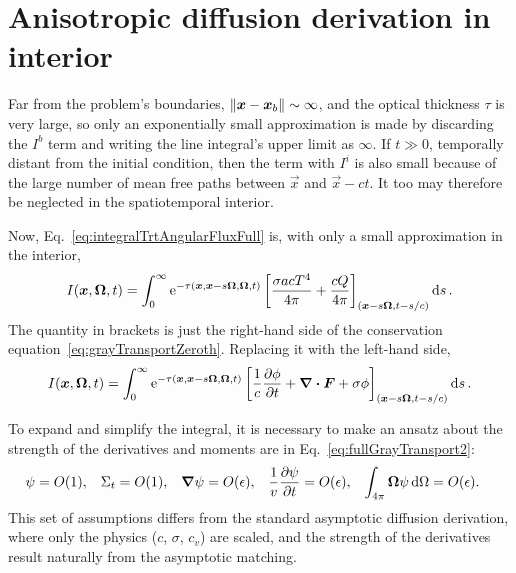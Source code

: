 \section{Anisotropic diffusion derivation in interior}
Far from the problem's boundaries, $\left\| \bm{x} - \bm{x}_b \right\| \sim \infty$,
and the optical thickness $\tau$ is very large, so only an exponentially small
approximation is made by discarding the $I^b$ term and writing the line
integral's upper limit as $\infty$. If $t\gg 0$, temporally distant from the
initial condition, then the term with $I^i$ is also small because of the large
number of mean free paths between $\vec{x}$ and $\vec{x} - c t$. It too may
therefore be neglected in the spatiotemporal interior.

Now, Eq.~\eqref{eq:integralTrtAngularFluxFull} is, with only a small
approximation in the interior,
\begin{equation*}
    I(\bm{x}, \bm{\Omega}, t)
    = \int_{0}^{\infty}
    \mathop{}\!\mathrm{e}^{ -\tau(\bm{x}, \bm{x} - s \bm{\Omega}, \bm{\Omega}, t)}
    \left[ \frac{\sigma a c T^4}{4\pi} + \frac{c Q}{4\pi} \right]_{(\bm{x} - s
    \bm{\Omega}, t-s/c)} \mathop{}\!\mathrm{d} s\,.
\end{equation*}
The quantity in brackets is just the right-hand side of the conservation
equation~\eqref{eq:grayTransportZeroth}. Replacing it with the left-hand
side,
\begin{equation*}
    I(\bm{x}, \bm{\Omega}, t)
    = \int_{0}^{\infty}
    \mathop{}\!\mathrm{e}^{ -\tau(\bm{x}, \bm{x} - s \bm{\Omega}, \bm{\Omega}, t)}
    \left[ \frac{1}{c} \frac{\partial \phi}{\partial t} +\bm{\nabla} \bm{\cdot} \bm{F} + \sigma \phi
    \right]_{(\bm{x} - s \bm{\Omega}, t-s/c)} \mathop{}\!\mathrm{d} s\,.
\end{equation*}

To expand and simplify the integral, it is necessary to make an ansatz about
the strength of the derivatives and moments are in
Eq.~\eqref{eq:fullGrayTransport2}:
\begin{align*}
  \psi &= O(1), &
  \Sigma_t &= O(1), &
  \bm{\nabla} \psi &= O(\epsilon), &
  \frac1v\frac{\partial \psi}{\partial t} &= O(\epsilon), &
  \int_{4\pi} \bm{\Omega} \psi\mathop{}\!\mathrm{d} \Omega &= O(\epsilon).
\end{align*}
This set of assumptions differs from the standard asymptotic diffusion
derivation, where only the physics ($c$, $\sigma$, $c_v$) are scaled, and the
strength of the derivatives result naturally from the asymptotic matching.

